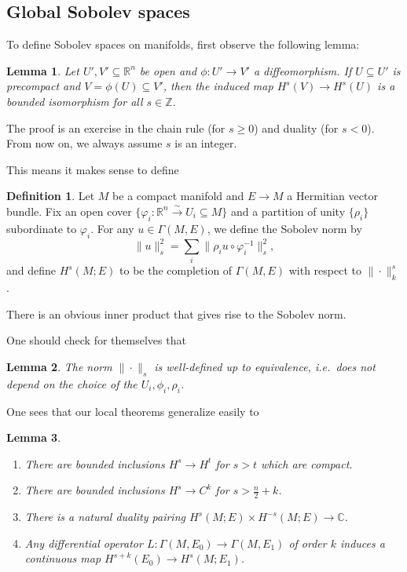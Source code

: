 \documentclass{shortart}
\newtheorem*{lemma}{Lemma}
\theoremstyle{definition}
\newtheorem*{defi}{Definition}
\newcommand\R{\mathbb{R}}
\newcommand\Z{\mathbb{Z}}
\newcommand\C{\mathbb{C}}
\begin{document}
\subsection{Global Sobolev spaces}
To define Sobolev spaces on manifolds, first observe the following lemma:
\begin{lemma}
  Let $U', V' \subseteq \R^n$ be open and $\phi: U' \to V'$ a diffeomorphism. If $U \subseteq U'$ is precompact and $V = \phi(U) \subseteq V'$, then the induced map $H^s(V) \to H^s(U)$ is a bounded isomorphism for all $s \in \Z$.\fakeqed
\end{lemma}
The proof is an exercise in the chain rule (for $s \geq 0$) and duality (for $s < 0$). From now on, we always assume $s$ is an integer.

This means it makes sense to define
\begin{defi}
  Let $M$ be a compact manifold and $E \to M$ a Hermitian vector bundle. Fix an open cover $\{\varphi_i: \R^n \overset{\sim}{\to} U_i \subseteq M\}$ and a partition of unity $\{\rho_i\}$ subordinate to $\varphi_i$. For any $u \in \Gamma(M, E)$, we define the Sobolev norm by
  \[
    \|u\|_s^2 = \sum_i \|\rho_i u \circ \varphi_i^{-1}\|_s^2,
  \]
  and define $H^s(M; E)$ to be the completion of $\Gamma(M, E)$ with respect to $\|\cdot\|_k^s$.
\end{defi}
There is an obvious inner product that gives rise to the Sobolev norm.

One should check for themselves that
\begin{lemma}
  The norm $\|\cdot\|_s$ is well-defined up to equivalence, i.e.\ does not depend on the choice of the $U_i, \phi_i, \rho_i$.\fakeqed
\end{lemma}

One sees that our local theorems generalize easily to

\begin{lemma}\leavevmode
  \begin{enumerate}
    \item There are bounded inclusions $H^s \to H^t$ for $s > t$ which are compact.
    \item There are bounded inclusions $H^s \to C^k$ for $s > \frac{n}{2} + k$.
    \item There is a natural duality pairing $H^s(M; E) \times H^{-s}(M; E) \to \C$.
    \item Any differential operator $L: \Gamma(M, E_0) \to \Gamma(M, E_1)$ of order $k$ induces a continuous map $H^{s + k}(E_0) \to H^s(M; E_1)$.\fakeqed
  \end{enumerate}
\end{lemma}
\end{document}
